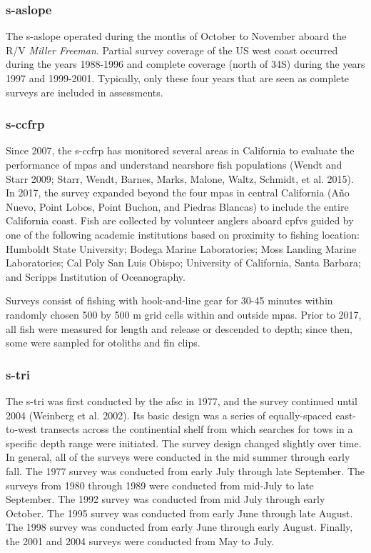 \documentclass[11pt,
  english,
  letterpaper,
]{article}
\begin{document}
\hypertarget{section}{%
\subsubsection{\texorpdfstring{\acrlong{s-aslope}}{}}\label{section}}

The \gls{s-aslope} operated during the months of October to November aboard the R/V \emph{Miller Freeman}. Partial survey coverage of the US west coast occurred during the years 1988-1996 and complete coverage (north of 34\textquotesingle S) during the years 1997 and 1999-2001. Typically, only these four years that are seen as complete surveys are included in assessments.

\hypertarget{section-1}{%
\subsubsection{\texorpdfstring{\acrlong{s-ccfrp}}{}}\label{section-1}}

Since 2007, the \gls{s-ccfrp} has monitored several areas in California to evaluate the performance of \glspl{mpa} and understand nearshore fish populations (Wendt and Starr 2009; Starr, Wendt, Barnes, Marks, Malone, Waltz, Schmidt, et al. 2015). In 2017, the survey expanded beyond the four \Gls{mpa}s in central California (Año Nuevo, Point Lobos, Point Buchon, and Piedras Blancas) to include the entire California coast. Fish are collected by volunteer anglers aboard \glspl{cpfv} guided by one of the following academic institutions based on proximity to fishing location: Humboldt State University; Bodega Marine Laboratories; Moss Landing Marine Laboratories; Cal Poly San Luis Obispo; University of California, Santa Barbara; and Scripps Institution of Oceanography.

Surveys consist of fishing with hook-and-line gear for 30-45 minutes within randomly chosen 500 by 500 m grid cells within and outside \glspl{mpa}. Prior to 2017, all fish were measured for length and release or descended to depth; since then, some were sampled for otoliths and fin clips.

\hypertarget{section-2}{%
\subsubsection{\texorpdfstring{\acrlong{s-tri}}{}}\label{section-2}}

The \gls{s-tri} was first conducted by the \gls{afsc} in 1977, and the survey continued until 2004 (Weinberg et al. 2002). Its basic design was a series of equally-spaced east-to-west transects across the continential shelf from which searches for tows in a specific depth range were initiated. The survey design changed slightly over time. In general, all of the surveys were conducted in the mid summer through early fall. The 1977 survey was conducted from early July through late September. The surveys from 1980 through 1989 were conducted from mid-July to late September. The 1992 survey was conducted from mid July through early October. The 1995 survey was conducted from early June through late August. The 1998 survey was conducted from early June through early August. Finally, the 2001 and 2004 surveys were conducted from May to July.
\end{document}
